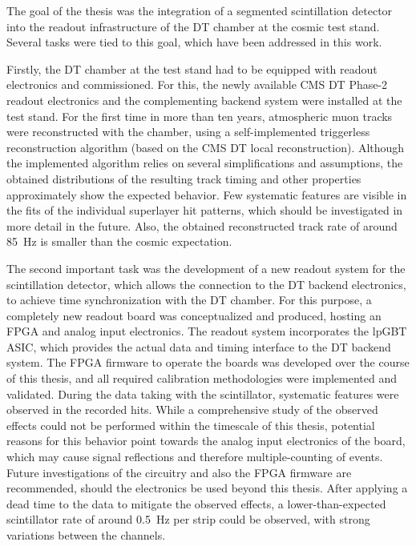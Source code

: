 



\label{sec:SummaryOutlook}

The goal of the thesis was the integration of a segmented scintillation detector into the readout infrastructure of the \ac{DT} chamber at the cosmic test stand. Several tasks were tied to this goal, which have been addressed in this work.
\par Firstly, the \ac{DT} chamber at the test stand had to be equipped with readout electronics and commissioned. For this, the newly available \ac{CMS} \ac{DT} Phase-2 readout electronics and the complementing backend system were installed at the test stand. For the first time in more than ten years, atmospheric muon tracks were reconstructed with the chamber, using a self-implemented triggerless reconstruction algorithm (based on the \ac{CMS} \ac{DT} local reconstruction). Although the implemented algorithm relies on several simplifications and assumptions, the obtained distributions of the resulting track timing and other properties approximately show the expected behavior. Few systematic features are visible in the fits of the individual superlayer hit patterns, which should be investigated in more detail in the future. Also, the obtained reconstructed track rate of around \SI{85}{\hertz} is smaller than the cosmic expectation.
\par The second important task was the development of a new readout system for the scintillation detector, which allows the connection to the \ac{DT} backend electronics, to achieve time synchronization with the \ac{DT} chamber. For this purpose, a completely new readout board was conceptualized and produced, hosting an \ac{FPGA} and analog input electronics. The readout system incorporates the \ac{lpGBT} \ac{ASIC}, which provides the actual data and timing interface to the \ac{DT} backend system. The \ac{FPGA} firmware to operate the boards was developed over the course of this thesis, and all required calibration methodologies were implemented and validated. During the data taking with the scintillator, systematic features were observed in the recorded hits. While a comprehensive study of the observed effects could not be performed within the timescale of this thesis, potential reasons for this behavior point towards the analog input electronics of the board, which may cause signal reflections and therefore multiple-counting of events. Future investigations of the circuitry and also the \ac{FPGA} firmware are recommended, should the electronics be used beyond this thesis. After applying a dead time to the data to mitigate the observed effects, a lower-than-expected scintillator rate of around \SI{0.5}{\hertz} per strip could be observed, with strong variations between the channels.
